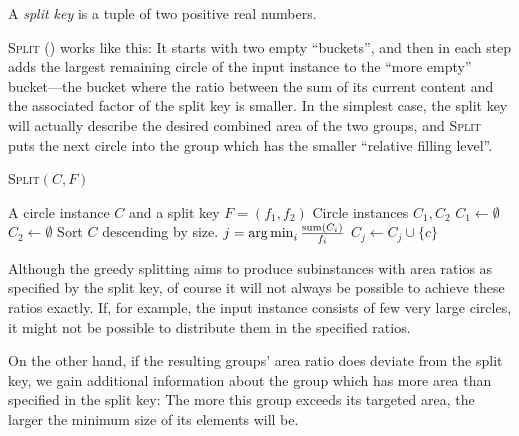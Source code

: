 \documentclass[a4paper,style=print,oneside,bibliography=totoc,nexus,lnum,extramargin]{tubsbook}
\begin{document}
\begin{definition}
    A \emph{split key} is a tuple of two positive real numbers.
\end{definition}

\textsc{Split} () works like this: It starts with two empty “buckets”, and then in each step adds the largest remaining circle of the input instance to the “more empty” bucket---the bucket where the ratio between the sum of its current content and the associated factor of the split key is smaller.
In the simplest case, the split key will actually describe the desired combined area of the two groups, and \textsc{Split} puts the next circle into the group which has the smaller “relative filling level”.

\begin{algorithm}
    \caption{\textsc{Split}$(C,F)$}
    \label{alg:split}
    \begin{algorithmic}
        \Require A circle instance $C$ and a split key $F = (f_1, f_2)$
        \Ensure Circle instances $C_1, C_2$
        \State $C_1 \gets \emptyset$
        \State $C_2 \gets \emptyset$
        \State Sort $C$ descending by size.
            \State $j = \operatorname*{arg\,min}_{i} \frac{\operatorname{sum}(C_i)}{f_i}$
            \State $C_j \gets C_j \cup \{c\}$
        \EndFor
    \end{algorithmic}
\end{algorithm}

Although the greedy splitting aims to produce subinstances with area ratios as specified by the split key, of course it will not always be possible to achieve these ratios exactly. If, for example, the input instance consists of few very large circles, it might not be possible to distribute them in the specified ratios.

On the other hand, if the resulting groups' area ratio does deviate from the split key, we gain additional information about the group which has more area than specified in the split key: The more this group exceeds its targeted area, the larger the minimum size of its elements will be.
\end{document}
